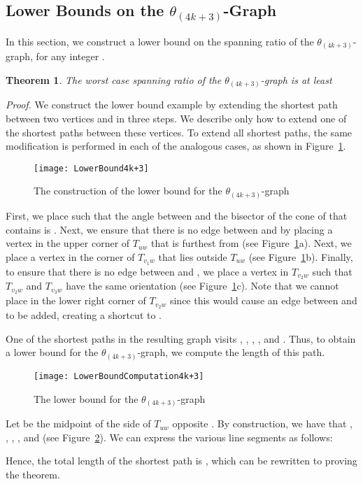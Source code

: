 \documentclass[12pt]{article}
\newtheorem{theo}[defin]{Theorem}
\newenvironment{theorem}{\begin{theo} \sl}{\end{theo}}
\newenvironment{proof}{\emph{Proof.}}{\hfill \\}
\newcommand{\Graph}[1]{\ensuremath{\theta_{(4 k + #1)}}-Graph\xspace}
\newcommand{\graph}[1]{\ensuremath{\theta_{(4 k + #1)}}-graph\xspace}
\newcommand{\canon}[2]{\ensuremath{T_{#1 #2}}}
\begin{document}
\subsection{Lower Bounds on the \Graph{3}}
In this section, we construct a lower bound on the spanning ratio of the \graph{3}, for any integer . 

\begin{theorem}
  \label{theo:LowerBound4k+3}
  The worst case spanning ratio of the \graph{3} is at least  
\end{theorem}
\begin{proof}
We construct the lower bound example by extending the shortest path between two vertices  and  in three steps. We describe only how to extend one of the shortest paths between these vertices. To extend all shortest paths, the same modification is performed in each of the analogous cases, as shown in Figure~\ref{fig:LowerBound4k+3}. 

\begin{figure}[ht]
  \begin{center}
    \texttt{[image: LowerBound4k+3]}
  \end{center}
  \vspace{-1em}
  \caption{The construction of the lower bound for the \graph{3}}
  \label{fig:LowerBound4k+3}
\end{figure}

First, we place  such that the angle between  and the bisector of the cone of  that contains  is . Next, we ensure that there is no edge between  and  by placing a vertex  in the upper corner of \canon{u}{w} that is furthest from  (see Figure~\ref{fig:LowerBound4k+3}a). Next, we place a vertex  in the corner of \canon{v_1}{w} that lies outside \canon{u}{w} (see Figure~\ref{fig:LowerBound4k+3}b). Finally, to ensure that there is no edge between  and , we place a vertex  in \canon{v_2}{w} such that \canon{v_2}{w} and \canon{v_3}{w} have the same orientation (see Figure~\ref{fig:LowerBound4k+3}c). Note that we cannot place  in the lower right corner of \canon{v_2}{w} since this would cause an edge between  and  to be added, creating a shortcut to . 

One of the shortest paths in the resulting graph visits , , , , and . Thus, to obtain a lower bound for the \graph{3}, we compute the length of this path. 

\begin{figure}[ht]
  \begin{center}
    \texttt{[image: LowerBoundComputation4k+3]}
  \end{center}
  \caption{The lower bound for the \graph{3}}
  \label{fig:LowerBoundComputation4k+3}
\end{figure}

Let  be the midpoint of the side of \canon{u}{w} opposite . By construction, we have that , , , , and  (see Figure~\ref{fig:LowerBoundComputation4k+3}). We can express the various line segments as follows: 



Hence, the total length of the shortest path is , which can be rewritten to  proving the theorem. 
\end{proof}
\end{document}
